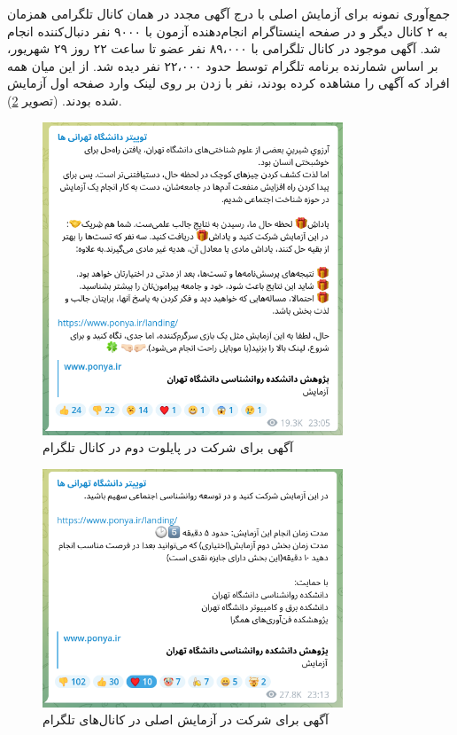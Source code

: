جمع‌آوری نمونه برای آزمایش اصلی با درج آگهی مجدد در همان کانال تلگرامی همزمان به ۲ کانال دیگر  و در صفحه اینستاگرام انجام‌دهنده آزمون با ۹۰۰۰ نفر دنبال‌کننده 
انجام شد. آگهی موجود در کانال تلگرامی با ۸۹،۰۰۰ نفر عضو تا ساعت ۲۲ روز ۲۹ شهریور، 
بر اساس شمارنده برنامه تلگرام توسط حدود ۲۲،۰۰۰ نفر دیده شد. از این میان همه افراد که آگهی را مشاهده کرده بودند،
\InitialSampleSizeTotal
نفر با زدن بر روی لینک وارد صفحه اول آزمایش شده بودند. 
(\!تصویر \ref{fig:TaskAdvertisement02Telegram}).
 \begin{figure}[htpb]
    \centering
    \includegraphics[width=0.8\textwidth,height=0.8\textheight,keepaspectratio]{./img/TaskAdvertisement01Telegram.png}
    \caption{آگهی برای شرکت در پایلوت دوم در کانال تلگرام }
    \label{fig:TaskAdvertisement01Telegram}
    \end{figure}
 
\begin{figure}[htpb]
    \centering
    \includegraphics[width=0.8\textwidth,height=0.8\textheight,keepaspectratio]{./img/TaskAdvertisement02Telegram.png}
    \caption{آگهی برای شرکت در آزمایش اصلی در کانال‌های تلگرام }
    \label{fig:TaskAdvertisement02Telegram}
    \end{figure}
         